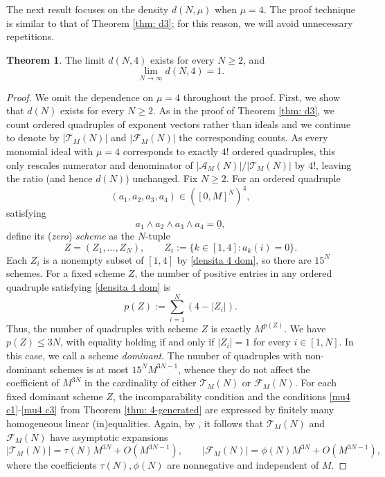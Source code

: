 \documentclass[a4paper,10pt,reqno]{amsart}
\theoremstyle{definition}
\newtheorem{theorem}{Theorem}[section]
\theoremstyle{definition}
\begin{document}
The next result focuses on the density $d(N,\mu)$ when $\mu=4$. The proof technique is similar to that of Theorem \ref{thm: d3}; for this reason, we will avoid unnecessary repetitions.
\begin{theorem}
    The limit $d(N,4)$ exists for every $N\ge 2$, and
    \[ \lim_{N\to\infty} d(N,4) = 1.\]   
\end{theorem}
\begin{proof}
    We omit the dependence on $\mu=4$ throughout the proof. First, we show that $d(N)$ exists for every $N\ge 2$. As in the proof of Theorem \ref{thm: d3}, we count ordered quadruples of exponent vectors rather than ideals and we continue to denote by $|\mathcal T_M(N)|$ and $|\mathcal F_M(N)|$ the corresponding counts. As every monomial ideal with $\mu=4$ corresponds to exactly $4!$ ordered quadruples, this only rescales numerator and denominator of $\lvert \mathcal A_M(N)\rvert/\lvert\mathcal T_M(N)\rvert$ by $4!$, leaving the ratio (and hence $d(N)$) unchanged. Fix $N\ge 2$. For an ordered quadruple
    \[ (a_1,a_2,a_3,a_4)\in ([0,M]^N)^4,\]
    satisfying
    \begin{equation}\label{densita 4 dom}
        a_1\wedge a_2\wedge a_3\wedge a_4 = \underline 0,
    \end{equation}
    define its (\emph{zero}) \emph{scheme} as the $N$-tuple
    \[ Z=(Z_1,\dots,Z_N), \qquad Z_i:=\{k\in[1,4]:a_k(i)=0\}. \]
    Each $Z_i$ is a nonempty subset of $[1,4]$ by \eqref{densita 4 dom}, so there are $15^N$ schemes. For a fixed scheme $Z$, the number of positive entries in any ordered quadruple satisfying \eqref{densita 4 dom} is
    \[ p(Z):=\sum_{i=1}^N(4-|Z_i|). \]
    Thus, the number of quadruples with scheme $Z$ is exactly $M^{p(Z)}$. We have $p(Z)\le 3N$, with equality holding if and only if $|Z_i|=1$ for every $i\in [1,N]$. In this case, we call a scheme \emph{dominant}. The number of quadruples with non-dominant schemes is at most $15^N M^{3N-1}$, whence they do not affect the coefficient of $M^{3N}$ in the cardinality of either $\mathcal T_M(N)$ or $\mathcal F_M(N)$. For each fixed dominant scheme $Z$, the incomparability condition and the conditions \ref{mu4 c1}-\ref{mu4 c3} from Theorem \ref{thm: 4-generated} are expressed by finitely many homogeneous linear (in)equalities. Again, by \cite[Theorem 3.23, Exercise 3.34]{Be-Ro}, it follows that $\mathcal T_M(N)$ and $\mathcal F_M(N)$ have asymptotic expansions
    \[ \lvert\mathcal T_M(N)\rvert=\tau(N)M^{3N}+O(M^{3N-1}),\qquad \lvert\mathcal F_M(N)\rvert=\phi(N)M^{3N}+O(M^{3N-1}), \]
    where the coefficients $\tau(N),\phi(N)$ are nonnegative and independent of $M$.

\end{proof}
\end{document}
